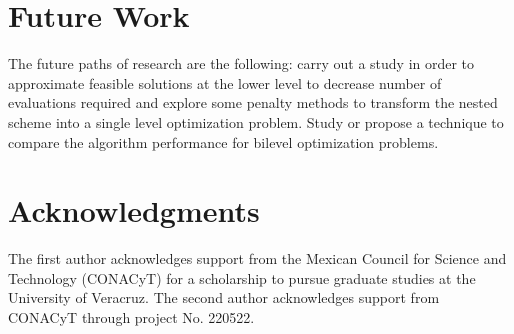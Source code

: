 \documentclass[conference]{IEEEtran}
\begin{document}
\section{Future Work}
\label{sec:future}

The future paths of research are the following: carry out a study in
order to approximate feasible solutions at the lower level to decrease number of
evaluations required and explore some penalty methods to transform the
nested scheme into a single level optimization problem. Study or propose a technique
to compare the algorithm performance for bilevel optimization problems.

\section*{Acknowledgments}
The first author acknowledges support from the Mexican Council for Science and
Technology (CONACyT) for a scholarship to pursue graduate studies at the University
of Veracruz. The second author acknowledges support from CONACyT through project
No. 220522. 











\end{document}
